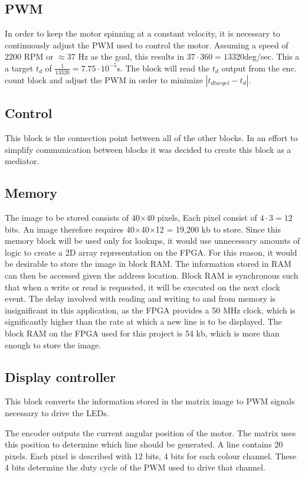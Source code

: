 \subsection{PWM}
In order to keep the motor spinning at a constant velocity, it is necessary to continuously adjust the PWM used to control the motor.
Assuming a speed of 2200 RPM or $\approx$37 Hz as the goal, this results in $37\cdot360=13320$deg/sec.
This a a target $t_d$ of $\frac{1}{13320}=7.75\cdot10^{-5}$s.
The block will read the $t_d$ output from the enc. count block and adjust the PWM in order to minimize $|t_{d target}-t_d|$.

\subsection{Control}
This block is the connection point between all of the other blocks.
In an effort to simplify communication between blocks it was decided to create this block as a mediator.

\subsection{Memory}
The image to be stored consists of 40$\times$40 pixels, Each pixel consist of $4 \cdot 3 = 12$ bits.
An image therefore requires 40$\times$40$\times$12   =  19,200 kb to store.  
Since this memory block will be used only for lookups, it would use unnecessary amounts of logic to create a 2D array representation on the FPGA.
For this reason, it would be desirable to store the image in block RAM.
The information stored in RAM can then be accessed given the address location.
Block RAM is synchronous such that when a write or read is requested, it will be executed on the next clock event.
The delay involved with reading and writing to and from memory is insignificant in this application, as the FPGA provides a 50 MHz clock, which is significantly higher than the rate at which a new line is to be displayed.
The block RAM on the FPGA used for this project is 54 kb, which is more than enough to store the image. \cite{FPGA}

\subsection{Display controller}
This block converts the information stored in the matrix image to PWM signals necessary to drive the LEDs.

The encoder outputs the current angular position of the motor.
The matrix uses this position to determine which line should be generated.
A line contains 20 pixels.
Each pixel is described with 12 bits, 4 bits for each colour channel.
These 4 bits determine the duty cycle of the PWM used to drive that channel.

